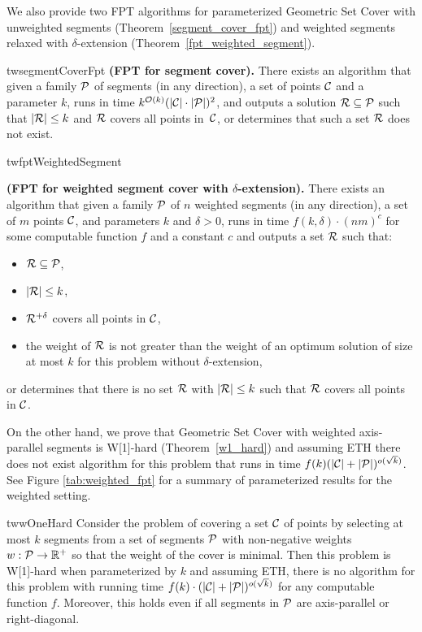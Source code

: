 We also provide two FPT algorithms for parameterized Geometric Set Cover 	
with unweighted segments (Theorem~\ref{segment_cover_fpt})
and weighted segments relaxed with $\delta$-extension
(Theorem~\ref{fpt_weighted_segment}).

\begin{restatable}{tw}{segmentCoverFpt}{
	\label{segment_cover_fpt}
	\textbf{(FPT for segment cover).}
	There exists an algorithm that given a family $\mathcal{P}$ of
	segments (in any direction),
	a set of points $\mathcal{C}$
	and a parameter $k$,
	runs in time ${k^{\mathcal{O}(k)} (|\mathcal{C}|\cdot|\mathcal{P}|)^2}$,
	and outputs a solution $\mathcal{R} \subseteq \mathcal{P}$
	such that $|\mathcal{R}| \le k$ and $\mathcal{R}$ covers all points in~$\mathcal{C}$,
	or determines that such a set $\mathcal{R}$ does not exist.
}\end{restatable}

\begin{restatable}{tw}{fptWeightedSegment}{
	\label{fpt_weighted_segment}
	\textbf{(FPT for weighted segment cover with $\delta$-extension).}
	There exists an algorithm that given a family $\mathcal{P}$ of
	$n$ weighted segments (in any direction),
	a set of $m$ points $\mathcal{C}$, and parameters $k$ and $\delta > 0$,
	runs in time $f(k, \delta) \cdot (nm)^c$ for some computable function $f$ and a constant $c$ and
	outputs a set $\mathcal{R}$ such that:
	\begin{itemize}
	\item $\mathcal{R} \subseteq \mathcal{P}$,
	\item $|\mathcal{R}| \le k$,
	\item $\mathcal{R}^{+\delta}$ covers all points in $\mathcal{C}$,
	\item the weight of $\mathcal{R}$ is not greater than the weight
	of an optimum solution of size at most $k$
	for this problem without $\delta$-extension,
	\end{itemize}
	or determines that there is no set $\mathcal{R}$ with $|\mathcal{R}| \le k$
	such that $\mathcal{R}$ covers all points in $\mathcal{C}$.
}\end{restatable}

On the other hand, we prove that Geometric Set Cover with weighted
axis-parallel segments is W[1]-hard (Theorem~\ref{w1_hard})
and assuming ETH there does not exist algorithm for this problem
that runs in time ${f(k)(|\mathcal{C}| + |\mathcal{P}|)^{o(\sqrt{k})}}$.
See Figure \ref{tab:weighted_fpt} for a summary of parameterized
results for the weighted setting.

\begin{restatable}{tw}{wOneHard}
\label{w1_hard}
	Consider the problem of covering a set $\mathcal{C}$ of points
	by selecting at most $k$ segments
	from a set of segments $\mathcal{P}$ 
	with non-negative weights $w : \mathcal{P} \rightarrow \mathbb{R^+}$
	so that the weight of the cover is minimal.
	Then this problem is W[1]-hard when parameterized by $k$ and
	assuming ETH, there is no algorithm for this
	problem with running time
	$f(k)\cdot(|\mathcal{C}| + |\mathcal{P}|)^{o(\sqrt{k})}$
	for any computable function $f$.
	Moreover, this holds even if all segments in $\mathcal{P}$
	are axis-parallel or right-diagonal.
\end{restatable}

